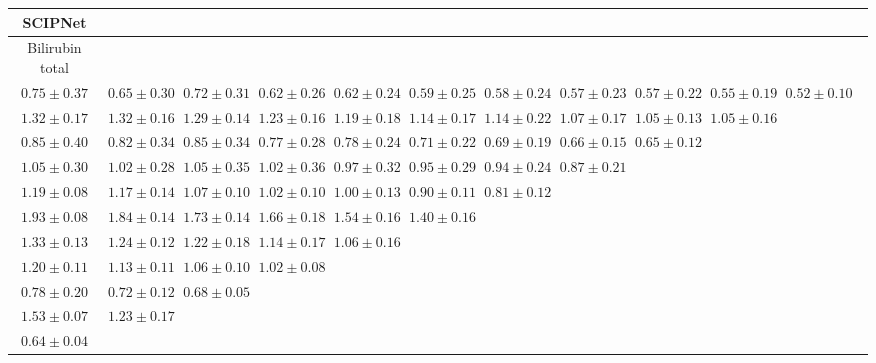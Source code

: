 \begin{table}[ht]
{{\begin{adjustbox}{width=\textwidth}
\begin{tabular}{cccccccccccc}
\hline
SCIPNet &  &  &  &  &  &  &  &  &  & \\
\hline
Bilirubin total &  &  &  &  &  &  &  &  &  & \\
\hline
$0.75 \pm 0.37$ & $0.65 \pm 0.30$ & $0.72 \pm 0.31$ & $0.62 \pm 0.26$ & $0.62 \pm 0.24$ & $0.59 \pm 0.25$ & $0.58 \pm 0.24$ & $0.57 \pm 0.23$ & $0.57 \pm 0.22$ & $0.55 \pm 0.19$ & $0.52 \pm 0.10$ &  \\
$1.32 \pm 0.17$ & $1.32 \pm 0.16$ & $1.29 \pm 0.14$ & $1.23 \pm 0.16$ & $1.19 \pm 0.18$ & $1.14 \pm 0.17$ & $1.14 \pm 0.22$ & $1.07 \pm 0.17$ & $1.05 \pm 0.13$ & $1.05 \pm 0.16$ &  &  \\
$0.85 \pm 0.40$ & $0.82 \pm 0.34$ & $0.85 \pm 0.34$ & $0.77 \pm 0.28$ & $0.78 \pm 0.24$ & $0.71 \pm 0.22$ & $0.69 \pm 0.19$ & $0.66 \pm 0.15$ & $0.65 \pm 0.12$ &  &  &  \\
$1.05 \pm 0.30$ & $1.02 \pm 0.28$ & $1.05 \pm 0.35$ & $1.02 \pm 0.36$ & $0.97 \pm 0.32$ & $0.95 \pm 0.29$ & $0.94 \pm 0.24$ & $0.87 \pm 0.21$ &  &  &  &  \\
$1.19 \pm 0.08$ & $1.17 \pm 0.14$ & $1.07 \pm 0.10$ & $1.02 \pm 0.10$ & $1.00 \pm 0.13$ & $0.90 \pm 0.11$ & $0.81 \pm 0.12$ &  &  &  &  &  \\
$1.93 \pm 0.08$ & $1.84 \pm 0.14$ & $1.73 \pm 0.14$ & $1.66 \pm 0.18$ & $1.54 \pm 0.16$ & $1.40 \pm 0.16$ &  &  &  &  &  &  \\
$1.33 \pm 0.13$ & $1.24 \pm 0.12$ & $1.22 \pm 0.18$ & $1.14 \pm 0.17$ & $1.06 \pm 0.16$ &  &  &  &  &  &  &  \\
$1.20 \pm 0.11$ & $1.13 \pm 0.11$ & $1.06 \pm 0.10$ & $1.02 \pm 0.08$ &  &  &  &  &  &  &  &  \\
$0.78 \pm 0.20$ & $0.72 \pm 0.12$ & $0.68 \pm 0.05$ &  &  &  &  &  &  &  &  &  \\
$1.53 \pm 0.07$ & $1.23 \pm 0.17$ &  &  &  &  &  &  &  &  &  &  \\
$0.64 \pm 0.04$ &  &  &  &  &  &  &  &  &  &  &  \\

\end{tabular}

\end{adjustbox}
}
}
\end{table}
